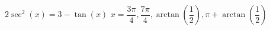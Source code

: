 { $2\sec^{2}(x) = 3 - \tan(x)$}
{ $x=\dfrac{3\pi}{4}, \dfrac{7\pi}{4}, \arctan\left(\dfrac{1}{2}\right), \pi +\arctan\left(\dfrac{1}{2}\right) $}
